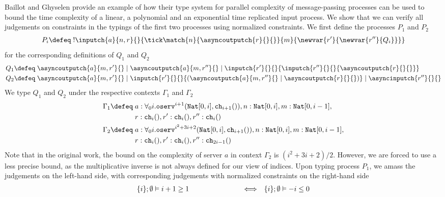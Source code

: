 \begin{examp}\label{example:baillotghyssimple}
Baillot and Ghyselen \cite{BaillotGhyselen2021} provide an example of how their type system for parallel complexity of message-passing processes can be used to bound the time complexity of a linear, a polynomial and an exponential time replicated input process. We show that we can verify all judgements on constraints in the typings of the first two processes using normalized constraints. We first define the processes $P_1$ and $P_2$
\begin{align*}
    P_i \defeq\; !\inputch{a}{n,r}{}{\tick\match{n}{\asyncoutputch{r}{}{}}{m}{\newvar{r'}{\newvar{r''}{Q_i}}}}
\end{align*}
for the corresponding definitions of $Q_1$ and $Q_2$
\begin{align*}
    Q_1 \defeq&\; \asyncoutputch{a}{m,r'}{} \mid \asyncoutputch{a}{m,r''}{} \mid \inputch{r'}{}{}{\inputch{r''}{}{}{\asyncoutputch{r}{}{}}}\\
    Q_2 \defeq&\; \asyncoutputch{a}{m,r'}{} \mid \inputch{r'}{}{}{(\asyncoutputch{a}{m,r''}{} \mid \asyncoutputch{r}{}{})} \mid \asyncinputch{r''}{}{}
\end{align*}
We type $Q_1$ and $Q_2$ under the respective contexts $\Gamma_1$ and $\Gamma_2$
\begin{align*}
    \Gamma_1 \defeq&\; a : \forall_0 i.\texttt{oserv}^{i+1}(\texttt{Nat}[0,i],\texttt{ch}_{i+1}()), n : \texttt{Nat}[0,i], m : \texttt{Nat}[0,i-1],\\ &\; r : \texttt{ch}_{i}(),
     r' : \texttt{ch}_{i}(), r'' : \texttt{ch}_i()\\
    \Gamma_2 \defeq&\; a : \forall_0 i.\texttt{oserv}^{i^2+3i+2}(\texttt{Nat}[0,i],\texttt{ch}_{i+1}()), n : \texttt{Nat}[0,i], m : \texttt{Nat}[0,i-1],\\ &\; r : \texttt{ch}_{i}(),
     r' : \texttt{ch}_i(), r'' : \texttt{ch}_{2i-1}()
\end{align*}
Note that in the original work, the bound on the complexity of server $a$ in context $\Gamma_2$ is $(i^2+3i+2)/2$. However, we are forced to use a less precise bound, as the multiplicative inverse is not always defined for our view of indices. Upon typing process $P_1$, we amass the judgements on the left-hand side, with corresponding judgements with normalized constraints on the right-hand side
%
\begin{align*}
    &\{i\};\emptyset\vDash i + 1 \geq 1\kern7.5em\Longleftrightarrow &  \{i\};\emptyset\vDash -i \leq 0\\

\end{align*}
\end{examp}
